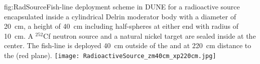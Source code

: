 \begin{dunefigure}[h]{fig:RadSource}{Fish-line deployment scheme in DUNE for a radioactive source
encapsulated inside a cylindrical Delrin moderator body with a
diameter of \SI{20}{\cm}, a height of \SI{40}{\cm} including
half-spheres at either end with radius of \SI{10}{\cm}. A
$^{252}$Cf neutron source and a natural nickel target are sealed
inside at the center. The fish-line is deployed \SI{40}{\cm}
outside of the  and at \SI{220}{\cm} distance to the
 (red plane).}
\texttt{[image: RadioactiveSource\_zm40cm\_xp220cm.jpg]}
\end{dunefigure}




